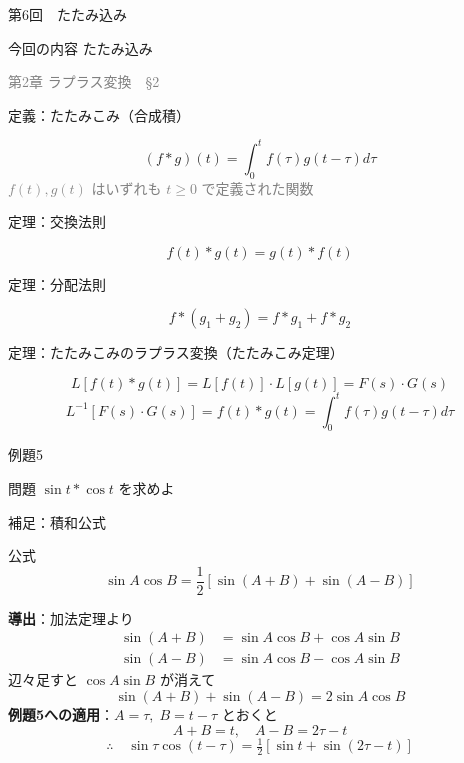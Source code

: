 \documentclass[professionalfonts]{beamer}
\begin{document}
\begin{frame}{第6回　たたみ込み}
  \begin{block}{今回の内容}
  たたみ込み
  \end{block}
  \vfill\hfill{\scriptsize \textcolor{gray}{第2章 ラプラス変換　§2}}
\end{frame}

\begin{frame}{定義：たたみこみ（合成積）}
  \begin{block}{}
  \[
    (f * g)(t) = \int_{0}^t f(\tau)g(t-\tau) d\tau
  \]
  {\footnotesize \textcolor{gray}{$f(t), g(t)$ はいずれも $t \geq 0$ で定義された関数}}
  \end{block}
\end{frame}

\begin{frame}{定理：交換法則}
  \begin{block}{}
  \[
    f(t) * g(t) = g(t) * f(t)
  \]
  \end{block}
\end{frame}

\begin{frame}{定理：分配法則}
  \begin{block}{}
  \[
    f * (g_{1} + g_{2}) = f*g_{1} + f*g_{2}
  \]
  \end{block}
\end{frame}

\begin{frame}{定理：たたみこみのラプラス変換（たたみこみ定理）}
  \begin{block}{}
  \[
    L[f(t) * g(t)] = L[f(t)] \cdot L[g(t)] = F(s) \cdot G(s)
  \]
  \[
    L^{-1}[F(s) \cdot G(s)] = f(t) * g(t) = \int_{0}^t f(\tau)g(t-\tau) d\tau
  \]
  \end{block}
\end{frame}

\begin{frame}{例題5}
  \begin{exampleblock}{問題}
    $\sin t * \cos t$ を求めよ\\[2pt]
  \end{exampleblock}
\end{frame}

\begin{frame}{補足：積和公式}
  \begin{block}{公式}
  \[
    \sin A \cos B = \frac{1}{2}[\sin(A+B) + \sin(A-B)]
  \]
  \end{block}
  \textbf{導出}：加法定理より
  \begin{align*}
    \sin(A+B) &= \sin A \cos B + \cos A \sin B \\
    \sin(A-B) &= \sin A \cos B - \cos A \sin B
  \end{align*}
  辺々足すと $\cos A \sin B$ が消えて
  \[
    \sin(A+B) + \sin(A-B) = 2\sin A \cos B
  \]
  \textbf{例題5への適用}：$A=\tau,\; B=t-\tau$ とおくと
  \[
    A+B = t,\quad A-B = 2\tau - t
  \]
  \[
    \therefore\quad \sin\tau\cos(t-\tau) = \tfrac{1}{2}[\sin t + \sin(2\tau-t)]
  \]
\end{frame}
\end{document}
